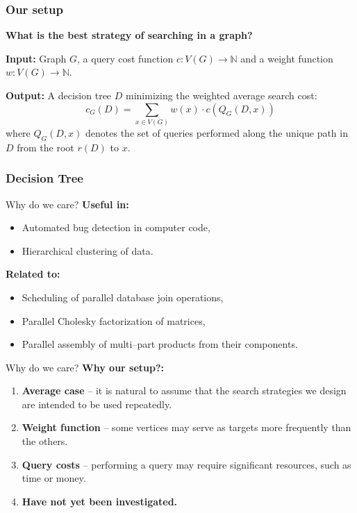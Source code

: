 \documentclass{beamer}
\newcommand{\br}[1]{\mathopen{}\left( #1 \right)}
\begin{document}
\begin{frame}
\frametitle{Our setup}
\textbf{What is the best strategy of searching in a graph?}
\begin{tcolorbox}[colback=white, title=Graph Search Problem (GSP), fonttitle=\bfseries, breakable]
\textbf{Input:} Graph $G$, a query cost function $c\colon V\br{G}\to \mathbb{N}$ and a weight function $w\colon V\br{G}\to \mathbb{N}$.

\pause
\textbf{Output:} A decision tree $D$ minimizing the weighted average search cost: 
$$c_G\br{D} = \sum_{x\in V\br{G}}w\br{x}\cdot c\br{Q_G\br{D, x}}$$
where $Q_G\br{D,x}$ denotes the set of queries performed 
along the unique path in $D$ from the root $r\br{D}$ to $x$.
\end{tcolorbox}
\end{frame}

\begin{frame}\frametitle{Decision Tree}


\end{frame}

\begin{frame}{Why do we care?}
    \textbf{Useful in:}
    \begin{itemize}
        \item Automated bug detection in computer code,
        \item Hierarchical clustering of data.
    \end{itemize}
    \textbf{Related to:}
    \begin{itemize}
        \item Scheduling of parallel database join operations,
        \item Parallel Cholesky factorization of matrices,
        \item Parallel assembly of multi–part products from their components.
    \end{itemize}
\end{frame}

\begin{frame}{Why do we care?}
\textbf{Why our setup?:}
\begin{enumerate}
    \item \textbf{Average case} – it is natural to assume that the search strategies we design are intended to be used repeatedly. 
    \item \textbf{Weight function} – some vertices may serve 
as targets more frequently than the others. 
    \item \textbf{Query costs} – performing a query may require 
significant resources, such as time or money. 
\item \textbf{Have not yet been investigated.}
\end{enumerate} 
\end{frame}
\end{document}

